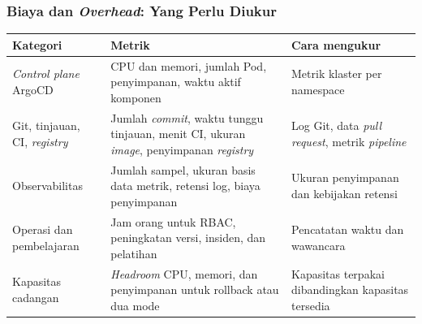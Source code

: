 {
\usebackgroundtemplate{\backgroundcontent}
\begin{frame}
    \frametitle{Biaya dan \textit{Overhead}: Yang Perlu Diukur}
    \centering
    \scriptsize
    \begin{tabularx}{\textwidth}{@{}>{\raggedright\arraybackslash}p{3.0cm}>{\raggedright\arraybackslash}X>{\raggedright\arraybackslash}p{3.6cm}@{}}
        \toprule
        \textbf{Kategori} & \textbf{Metrik} & \textbf{Cara mengukur} \\
        \midrule
        \textit{Control plane} ArgoCD & CPU dan memori, jumlah Pod, penyimpanan, waktu aktif komponen & Metrik klaster per namespace \\
        Git, tinjauan, CI, \textit{registry} & Jumlah \textit{commit}, waktu tunggu tinjauan, menit CI, ukuran \textit{image}, penyimpanan \textit{registry} & Log Git, data \textit{pull request}, metrik \textit{pipeline} \\
        Observabilitas & Jumlah sampel, ukuran basis data metrik, retensi log, biaya penyimpanan & Ukuran penyimpanan dan kebijakan retensi \\
        Operasi dan pembelajaran & Jam orang untuk RBAC, peningkatan versi, insiden, dan pelatihan & Pencatatan waktu dan wawancara \\
        Kapasitas cadangan & \textit{Headroom} CPU, memori, dan penyimpanan untuk rollback atau dua mode & Kapasitas terpakai dibandingkan kapasitas tersedia \\
        \bottomrule
    \end{tabularx}
    \vspace{0.12cm}
    \vspace{0.04cm}
\end{frame}
}

